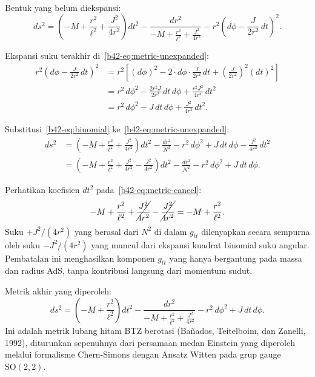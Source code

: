 Bentuk yang belum diekspansi:
\begin{equation}
    ds^2 = \left(-M + \frac{r^2}{\ell^2} + \frac{J^2}{4r^2}\right)dt^2 - \frac{dr^2}{-M + \frac{r^2}{\ell^2} + \frac{J^2}{4r^2}} - r^2\!\left(d\phi - \frac{J}{2r^2}\,dt\right)^2. \label{b42-eq:metric-unexpanded}
\end{equation}

Ekspansi suku terakhir di~\eqref{b42-eq:metric-unexpanded}:
\begin{align}
    r^2\!\left(d\phi - \frac{J}{2r^2}\,dt\right)^2 &= r^2\!\left[(d\phi)^2 - 2\cdot d\phi\cdot\frac{J}{2r^2}\,dt + \left(\frac{J}{2r^2}\right)^2(dt)^2\right] \nonumber\\[6pt]
    &= r^2\,d\phi^2 - \frac{2r^2 J}{2r^2}\,dt\,d\phi + \frac{r^2 J^2}{4r^4}\,dt^2 \nonumber\\[6pt]
    &= r^2\,d\phi^2 - J\,dt\,d\phi + \frac{J^2}{4r^2}\,dt^2. \label{b42-eq:binomial}
\end{align}

Substitusi~\eqref{b42-eq:binomial} ke~\eqref{b42-eq:metric-unexpanded}:
\begin{align}
    ds^2 &= \left(-M + \frac{r^2}{\ell^2} + \frac{J^2}{4r^2}\right)dt^2 - \frac{dr^2}{N^2} - r^2\,d\phi^2 + J\,dt\,d\phi - \frac{J^2}{4r^2}\,dt^2 \nonumber\\[8pt]
    &= \left(-M + \frac{r^2}{\ell^2} + \frac{J^2}{4r^2} - \frac{J^2}{4r^2}\right)dt^2 - \frac{dr^2}{N^2} - r^2\,d\phi^2 + J\,dt\,d\phi. \label{b42-eq:metric-cancel}
\end{align}

Perhatikan koefisien $dt^2$ pada~\eqref{b42-eq:metric-cancel}:
\begin{equation}
    -M + \frac{r^2}{\ell^2} + \cancel{\frac{J^2}{4r^2}} - \cancel{\frac{J^2}{4r^2}} = -M + \frac{r^2}{\ell^2}.
\end{equation}
Suku $+J^2/(4r^2)$ yang berasal dari $N^2$ di dalam $g_{tt}$ dilenyapkan secara sempurna oleh suku $-J^2/(4r^2)$ yang muncul dari ekspansi kuadrat binomial suku angular. Pembatalan ini menghasilkan komponen $g_{tt}$ yang hanya bergantung pada massa dan radius AdS, tanpa kontribusi langsung dari momentum sudut.

Metrik akhir yang diperoleh:
\begin{equation}
    ds^2 = \left(-M + \frac{r^2}{\ell^2}\right)dt^2 - \frac{dr^2}{-M + \frac{r^2}{\ell^2} + \frac{J^2}{4r^2}} - r^2\,d\phi^2 + J\,dt\,d\phi. \label{b42-eq:BTZ}
\end{equation}
Ini adalah metrik lubang hitam BTZ berotasi (Ba\~{n}ados, Teitelboim, dan Zanelli, 1992), diturunkan sepenuhnya dari persamaan medan Einstein yang diperoleh melalui formalisme Chern-Simons dengan Ansatz Witten pada grup gauge $\mathrm{SO}(2,2)$.

